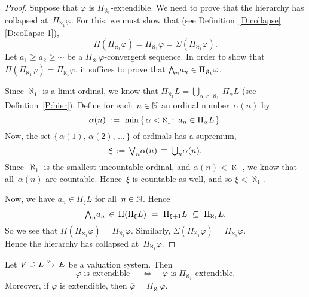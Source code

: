 \documentclass[main.tex]{subfiles}
\begin{document}
\begin{proof}
Suppose that $\varphi$ is $\Pi_{\aleph_1}$-extendible.
We need to prove that the hierarchy has collapsed at~$\Pi_{\aleph_1}\varphi$.
For this, we must show that
(see Definition~\ref{D:collapse}\ref{D:collapse-1}),
\begin{equation*}
\Pi(\Pi_{\aleph_1}\varphi)
= \Pi_{\aleph_1}\varphi = \Sigma(\Pi_{\aleph_1}\varphi).
\end{equation*}
Let $a_1 \geq a_2 \geq \dotsb$ 
be a $\Pi_{\aleph_1}\varphi$-convergent sequence.
In order to show that $\Pi(\Pi_{\aleph_1}\varphi)=\Pi_{\aleph_1}\varphi$,
it suffices to prove that $\textstyle{\bigwedge}_n a_n \in \Pi_{\aleph_1}\varphi$.

Since $\aleph_1$ is a limit ordinal,
we know that $\Pi_{\aleph_1} L = \bigcup_{\alpha < \aleph_1} \Pi_\alpha L$
(see Defintion~\ref{P:hier}).
Define for each~$n\in\mathbb{N}$
an ordinal number~$\alpha(n)$ by
\begin{equation*}
\alpha(n)\ \eqdf\ 
\min\,\{\, \alpha<\aleph_1\colon\, a_n \in \Pi_\alpha L\,\}.
\end{equation*}
Now,
the set $\{\,\alpha(1),\,\alpha(2),\,\dotsc\,\}$ of
ordinals has a supremum,
\begin{equation*}
\xi\,:=\,\textstyle{\bigvee}_n\alpha(n)\,\equiv\,\textstyle{\bigcup_n}\alpha(n).
\end{equation*}
Since~$\aleph_1$ is the smallest uncountable ordinal,
and $\alpha(n)<\aleph_1$,
we know that all~$\alpha(n)$ are countable.
Hence~$\xi$ is countable as well,
and so $\xi<\aleph_1$.

Now, we have $a_n \in \Pi_{\xi} L$
for all~$n\in \mathbb{N}$.  Hence
\begin{equation*}
\textstyle{\bigwedge}_n a_n \,\in\, \Pi(\Pi_{\xi} L) 
\ =\ \Pi_{\xi+1} L
\ \subseteq\ \Pi_{\aleph_1} L.
\end{equation*}
So we see that $\Pi(\Pi_{\aleph_1}\varphi)=\Pi_{\aleph_1}\varphi$.
Similarly, $\Sigma(\Pi_{\aleph_1}\varphi)=\Pi_{\aleph_1}\varphi$.\\
Hence the hierarchy has collapsed at~$\Pi_{\aleph_1}\varphi$.
\end{proof}
%
%
%
\begin{cor}
\label{C:aleph1}
Let $V \supseteq L\,\smash{\xrightarrow{\varphi}\,E}$ be a valuation system. Then
\begin{equation*}
\varphi\text{ is extendible }
\quad\iff\quad
\varphi\text{ is $\Pi_{\aleph_1}$-extendible.}
\end{equation*}
Moreover,
if $\varphi$ is extendible,
then $\overline\varphi = \Pi_{\aleph_1}\varphi$.
\end{cor}
\end{document}
